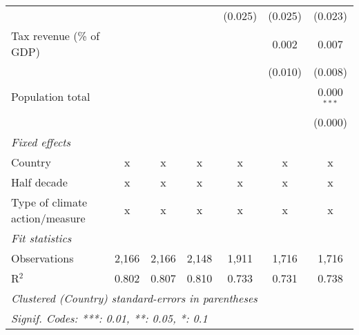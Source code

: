 \begin{tabular}{lcccccc}
                                                &         &                &                & (0.025)        & (0.025)        & (0.023)\\   
   Tax revenue (\% of GDP)                      &         &                &                &                & 0.002          & 0.007\\   
                                                &         &                &                &                & (0.010)        & (0.008)\\   
   Population total                             &         &                &                &                &                & 0.000$^{***}$\\   
                                                &         &                &                &                &                & (0.000)\\   
   \emph{Fixed effects}\\
   Country                                      & x       & x              & x              & x              & x              & x\\  
   Half decade                                  & x       & x              & x              & x              & x              & x\\  
   Type of climate action/measure               & x       & x              & x              & x              & x              & x\\  
   \midrule \emph{Fit statistics}\\
   Observations                                 & 2,166   & 2,166          & 2,148          & 1,911          & 1,716          & 1,716\\  
   R$^2$                                        & 0.802   & 0.807          & 0.810          & 0.733          & 0.731          & 0.738\\  
   \midrule
   \multicolumn{7}{l}{\emph{Clustered (Country) standard-errors in parentheses}}\\
   \multicolumn{7}{l}{\emph{Signif. Codes: ***: 0.01, **: 0.05, *: 0.1}}\\
\end{tabular}
\par\endgroup



